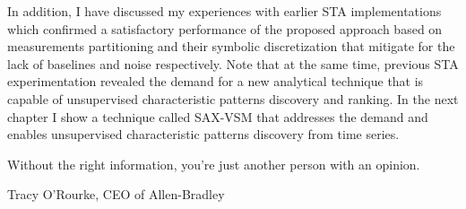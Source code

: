 In addition, I have discussed my experiences with earlier STA implementations which confirmed a satisfactory performance of 
the proposed approach based on measurements partitioning and their symbolic discretization that mitigate for the lack of baselines 
and noise respectively. Note that at the same time, previous STA experimentation revealed the demand for a new analytical technique 
that is capable of unsupervised characteristic patterns discovery and ranking. In the next chapter I show a technique called SAX-VSM 
that addresses the demand and enables unsupervised characteristic patterns discovery from time series.

\epigraph{Without the right information, you're just another person with an opinion.}{Tracy O'Rourke, CEO of Allen-Bradley}